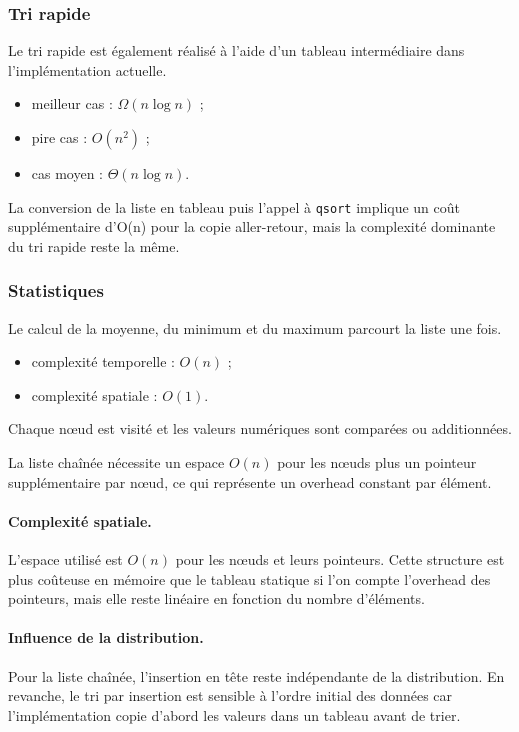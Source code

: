 \documentclass[12pt,a4paper]{article}
\begin{document}
\subsubsection{Tri rapide}
Le tri rapide est également réalisé à l’aide d’un tableau intermédiaire dans l’implémentation actuelle.
\begin{itemize}
  \item meilleur cas : $\Omega(n\log n)$ ;
  \item pire cas : $O(n^2)$ ;
  \item cas moyen : $\Theta(n\log n)$.
\end{itemize}
La conversion de la liste en tableau puis l’appel à \texttt{qsort} implique un coût supplémentaire d’O(n) pour la copie aller-retour, mais la complexité dominante du tri rapide reste la même.

\subsubsection{Statistiques}
Le calcul de la moyenne, du minimum et du maximum parcourt la liste une fois.
\begin{itemize}
  \item complexité temporelle : $O(n)$ ;
  \item complexité spatiale : $O(1)$.
\end{itemize}
Chaque nœud est visité et les valeurs numériques sont comparées ou additionnées.

La liste chaînée nécessite un espace $O(n)$ pour les nœuds plus un pointeur supplémentaire par nœud, ce qui représente un overhead constant par élément.

\paragraph{Complexité spatiale.} L’espace utilisé est $O(n)$ pour les nœuds et leurs pointeurs. Cette structure est plus coûteuse en mémoire que le tableau statique si l’on compte l’overhead des pointeurs, mais elle reste linéaire en fonction du nombre d’éléments.

\paragraph{Influence de la distribution.} Pour la liste chaînée, l’insertion en tête reste indépendante de la distribution. En revanche, le tri par insertion est sensible à l’ordre initial des données car l’implémentation copie d’abord les valeurs dans un tableau avant de trier.
\end{document}
